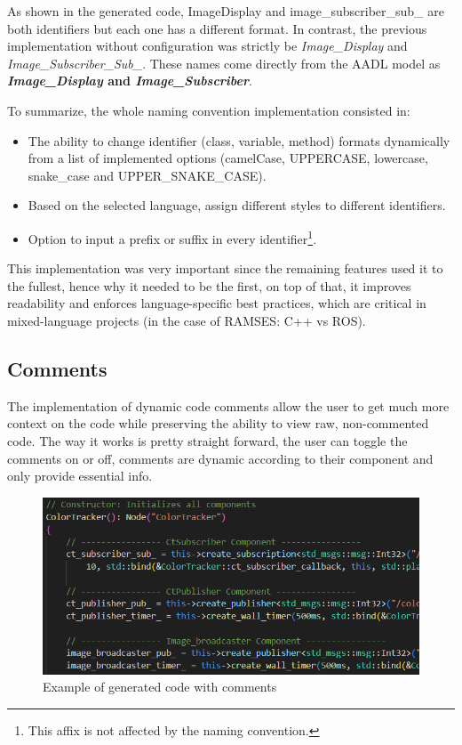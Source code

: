 As shown in the generated code, ImageDisplay and image\_subscriber\_sub\_ are both \glspl{identifier} but each one has a different format. In contrast, the previous implementation without configuration was strictly be \textit{Image\_Display} and \textit{Image\_Subscriber\_Sub\_}. These names come directly from the \gls{AADL} model as \textbf{\textit{Image\_Display} and \textit{Image\_Subscriber}}.

To summarize, the whole naming convention implementation consisted in:

\begin{itemize} 
	\item The ability to change \gls{identifier} (class, variable, method) formats dynamically from a list of implemented options (camelCase, UPPERCASE, lowercase, snake\_case and UPPER\_SNAKE\_CASE).
	\item Based on the selected language, assign different styles to different \glspl{identifier}.
	\item Option to input a prefix or suffix in every \gls{identifier}\footnote{This affix is not affected by the naming convention.}.
\end{itemize}

This implementation was very important since the remaining features used it to the fullest, hence why it needed to be the first, on top of that, it improves readability and enforces language-specific best practices, which are critical in mixed-language projects (in the case of \gls{RAMSES}: C++ vs ROS).


\subsection{Comments}
\label{sec:impl_comments}

The implementation of dynamic code comments allow the user to get much more context on the code while preserving the ability to view raw, non-commented code. The way it works is pretty straight forward, the user can toggle the comments on or off, comments are dynamic according to their component and only provide essential info.

\begin{figure}[htbp]
	\centering
	\includegraphics[width=\textwidth]{comments.png}
	\caption{Example of generated code with comments}
	\label{fig:comment}
\end{figure}


